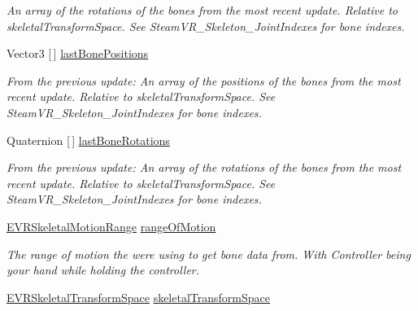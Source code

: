 \begin{DoxyCompactItemize}
\begin{DoxyCompactList}\small\item\em An array of the rotations of the bones from the most recent update. Relative to skeletal\+Transform\+Space. See Steam\+V\+R\+\_\+\+Skeleton\+\_\+\+Joint\+Indexes for bone indexes. \end{DoxyCompactList}\item 
Vector3 \mbox{[}$\,$\mbox{]} \mbox{\hyperlink{class_valve_1_1_v_r_1_1_steam_v_r___action___skeleton___source_a601384f599350e5d6a6ac875aa60d000}{last\+Bone\+Positions}}
\begin{DoxyCompactList}\small\item\em From the previous update\+: An array of the positions of the bones from the most recent update. Relative to skeletal\+Transform\+Space. See Steam\+V\+R\+\_\+\+Skeleton\+\_\+\+Joint\+Indexes for bone indexes. \end{DoxyCompactList}\item 
Quaternion \mbox{[}$\,$\mbox{]} \mbox{\hyperlink{class_valve_1_1_v_r_1_1_steam_v_r___action___skeleton___source_a3140bba743490896ed68bc3fe0850f5e}{last\+Bone\+Rotations}}
\begin{DoxyCompactList}\small\item\em From the previous update\+: An array of the rotations of the bones from the most recent update. Relative to skeletal\+Transform\+Space. See Steam\+V\+R\+\_\+\+Skeleton\+\_\+\+Joint\+Indexes for bone indexes. \end{DoxyCompactList}\item 
\mbox{\hyperlink{namespace_valve_1_1_v_r_affc8d18345f8f5d36f1ae7b4ce534500}{E\+V\+R\+Skeletal\+Motion\+Range}} \mbox{\hyperlink{class_valve_1_1_v_r_1_1_steam_v_r___action___skeleton___source_a40dadbdfafff861ded2fbca0b7a28a32}{range\+Of\+Motion}}
\begin{DoxyCompactList}\small\item\em The range of motion the we\textquotesingle{}re using to get bone data from. With Controller being your hand while holding the controller. \end{DoxyCompactList}\item 
\mbox{\hyperlink{namespace_valve_1_1_v_r_a916744fb3fc7b8e8ba224fba9bee6de4}{E\+V\+R\+Skeletal\+Transform\+Space}} \mbox{\hyperlink{class_valve_1_1_v_r_1_1_steam_v_r___action___skeleton___source_a8ae0c4bdc929e9487bd90a5c131df32a}{skeletal\+Transform\+Space}}

\end{DoxyCompactItemize}
